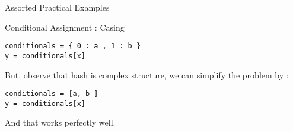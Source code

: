 \begin{section}{Assorted Practical Examples}
\begin{subsection}{Conditional Assignment : Casing }
\begin{center}\begin{minipage}{\linewidth}
\begin{lstlisting}[style=JexlStyle]
conditionals = { 0 : a , 1 : b }
y = conditionals[x]
\end{lstlisting}  
\end{minipage}\end{center}

But, observe that hash is complex structure, we can simplify the problem by :

\begin{center}\begin{minipage}{\linewidth}
\begin{lstlisting}[style=JexlStyle]
conditionals = [a, b ]
y = conditionals[x]
\end{lstlisting}  
\end{minipage}\end{center}
And that works perfectly well. 
\end{subsection}

\end{section}

